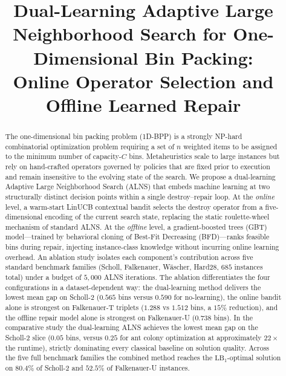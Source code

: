 \documentclass[conference]{IEEEtran}
\begin{document}
\title{Dual-Learning Adaptive Large Neighborhood Search for One-Dimensional Bin Packing:\\
	Online Operator Selection and Offline Learned Repair}

\author{
}

\maketitle

\begin{abstract}
	The one-dimensional bin packing problem (1D-BPP) is a strongly NP-hard
	combinatorial optimization problem requiring a set of $n$ weighted items to be
	assigned to the minimum number of capacity-$C$ bins.  Metaheuristics scale to
	large instances but rely on hand-crafted operators governed by policies that are
	fixed prior to execution and remain insensitive to the evolving state of the
	search.  We propose a dual-learning Adaptive Large Neighborhood Search (ALNS)
	that embeds machine learning at two structurally distinct decision points within
	a single destroy--repair loop.  At the \emph{online} level, a warm-start
	LinUCB contextual bandit selects the destroy operator from a five-dimensional
	encoding of the current search state, replacing the static roulette-wheel
	mechanism of standard ALNS.  At the \emph{offline} level, a gradient-boosted
	trees (GBT) model---trained by behavioral cloning of Best-Fit Decreasing
	(BFD)---ranks feasible bins during repair, injecting instance-class knowledge
	without incurring online learning overhead.  An ablation study isolates each
	component's contribution across five standard benchmark families (Scholl,
	Falkenauer, W\"ascher, Hard28, $685$ instances total) under a budget of
	$5{,}000$ ALNS iterations. The ablation differentiates the four configurations
	in a dataset-dependent way: the dual-learning method delivers the lowest mean
	gap on Scholl-2 ($0.565$ bins versus $0.590$ for no-learning), the online
	bandit alone is strongest on Falkenauer-T triplets ($1.288$ vs $1.512$ bins,
	a $15\%$ reduction), and the offline repair model alone is strongest on
	Falkenauer-U ($0.738$ bins). In the comparative study the dual-learning ALNS
	achieves the lowest mean gap on the Scholl-2 slice ($0.05$ bins, versus
	$0.25$ for ant colony optimization at approximately $22\times$ the runtime),
	strictly dominating every classical baseline on solution quality. Across the
	five full benchmark families the combined method reaches the
	$\mathrm{LB}_1$-optimal solution on $80.4\%$ of Scholl-2 and $52.5\%$ of
	Falkenauer-U instances.
\end{abstract}
\end{document}

